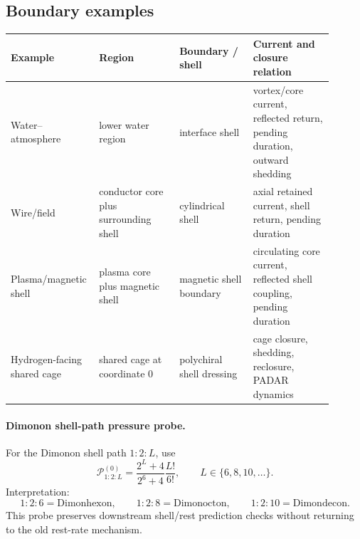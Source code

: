 \subsection{Boundary examples}\label{subsec:boundary-examples}
\begin{longtable}{>{\raggedright\arraybackslash}p{0.20\linewidth}p{0.24\linewidth}p{0.22\linewidth}p{0.24\linewidth}}
\toprule
Example & Region & Boundary / shell & Current and closure relation\\
\midrule
Water--atmosphere & lower water region & interface shell & vortex/core current, reflected return, pending duration, outward shedding\\
Wire/field & conductor core plus surrounding shell & cylindrical shell & axial retained current, shell return, pending duration\\
Plasma/magnetic shell & plasma core plus magnetic shell & magnetic shell boundary & circulating core current, reflected shell coupling, pending duration\\
Hydrogen-facing shared cage & shared cage at coordinate 0 & polychiral shell dressing & cage closure, shedding, reclosure, PADAR dynamics\\
\bottomrule
\end{longtable}

\paragraph{Dimonon shell-path pressure probe.}
For the Dimonon shell path \(1:2:L\), use
\[
\mathcal P^{(0)}_{1:2:L}
=
\frac{2^L+4}{2^6+4}\frac{L!}{6!},
\qquad
L\in\{6,8,10,\ldots\}.
\]
Interpretation:
\[
1:2:6=\mathrm{Dimonhexon},
\qquad
1:2:8=\mathrm{Dimonocton},
\qquad
1:2:10=\mathrm{Dimondecon}.
\]
This probe preserves downstream shell/rest prediction checks without returning to the old rest-rate mechanism.
